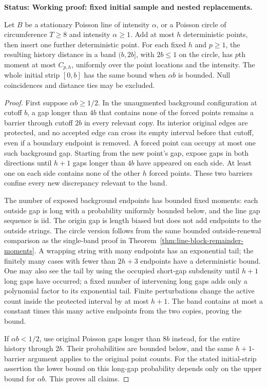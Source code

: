 \documentclass[11pt,letterpaper]{article}
\newcommand{\status}[1]{\textbf{Status: #1.}}
\begin{document}
\status{Working proof: fixed initial sample and nested replacements}

\begin{lemma}
\label{lem:forced-point-band-moments}
Let $B$ be a stationary Poisson line of intensity $\alpha$,
or a Poisson circle of circumference $T\ge8$ and intensity
$\alpha\ge1$. Add at most $h$ deterministic points, then
insert one further deterministic point. For each fixed
$h$ and $p\ge1$, the resulting history distance in a band
$(b,2b]$, with $2b\le1$ on the circle, has $p$th moment
at most $C_{p,h}$, uniformly over the point locations and
the intensity. The whole initial strip $[0,b]$ has the
same bound when $\alpha b$ is bounded.
Null coincidences and distance ties may be excluded.
\end{lemma}
\begin{proof}
First suppose $\alpha b\ge1/2$. In the unaugmented
background configuration at cutoff $b$, a gap longer than
$4b$ that contains none of the forced points remains a
barrier through cutoff $2b$ in every relevant copy.
Its interior original edges are protected, and no accepted
edge can cross its empty interval before that cutoff,
even if a boundary endpoint is removed.
A forced point can occupy at most one such background gap.
Starting from the new point's gap, expose gaps in both
directions until $h+1$ gaps longer than $4b$ have appeared
on each side. At least one on each side contains none of
the other $h$ forced points. These two barriers confine
every new discrepancy relevant to the band.

The number of exposed background endpoints has bounded
fixed moments: each outside gap is long with a probability
uniformly bounded below, and the line gap sequence is iid.
The origin gap is length biased but does not add endpoints
to the outside strings. The circle version follows from
the same bounded outside-renewal comparison as the
single-band proof in
Theorem~\ref{thm:line-block-remainder-moments}.
A wrapping string with many endpoints has an exponential
tail; the finitely many cases with fewer than $2h+3$
endpoints have a deterministic bound. One may also see the
tail by using the occupied short-gap subdensity until
$h+1$ long gaps have occurred; a fixed number of intervening
long gaps adds only a polynomial factor to its exponential
tail. Finite perturbations change the active count inside
the protected interval by at most $h+1$.
The band contains at most a constant times this many
active endpoints from the two copies, proving the bound.

If $\alpha b<1/2$, use original Poisson gaps longer than
$8b$ instead, for the entire history through $2b$.
Their probabilities are bounded below, and the same
$h+1$-barrier argument applies to the original point counts.
For the stated initial-strip assertion the lower bound
on this long-gap probability depends only on the upper
bound for $\alpha b$. This proves all claims.
\end{proof}
\end{document}
